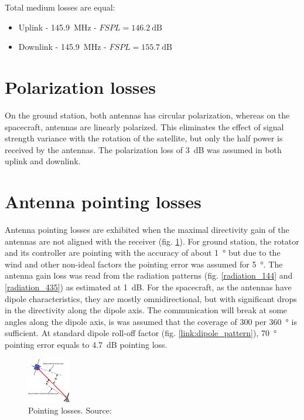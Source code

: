 Total medium losses are equal:
\begin{itemize}
    \item Uplink - \SI{145.9}{\MHz} - $FSPL = \SI{146.2}{\dB}$
    \item Downlink - \SI{145.9}{\MHz} - $FSPL = \SI{155.7}{\dB}$
\end{itemize}


\section{Polarization losses}
On the ground station, both antennas has circular polarization, whereas on the spacecraft, antennas are linearly polarized. This eliminates the effect of signal strength variance with the rotation of the satellite, but only the half power is received by the antennas. The polarization loss of \SI{3}{\dB} was assumed in both uplink and downlink.

\section{Antenna pointing losses}
Antenna pointing losses are exhibited when the maximal directivity gain of the antennas are not aligned with the receiver (fig. \ref{link:pointing_loss}). For ground station, the rotator and its controller are pointing with the accuracy of about \SI{1}{\degree} but due to the wind and other non-ideal factors the pointing error was assumed for \SI{5}{\degree}. The antenna gain loss was read from the radiation patterns (fig. \ref{radiation_144} and \ref{radiation_435}) as estimated at \SI{1}{\dB}. For the spacecraft, as the antennas have dipole characteristics, they are mostly omnidirectional, but with significant drops in the directivity along the dipole axis. The communication will break at some angles along the dipole axis, is was assumed that the coverage of \si{300} per \SI{360}{\degree} is sufficient. At standard dipole roll-off factor (fig. \ref{link:dipole_pattern}), \SI{70}{\degree} pointing error equals to \SI{4.7}{\dB} pointing loss.

\begin{figure}
    \centering
    \includegraphics[width=0.5\paperwidth]{img/6/pointing_loss.pdf}
    \caption{Pointing losses. Source: \cite{amsat_link_budget}}
    \label{link:pointing_loss}
\end{figure}

